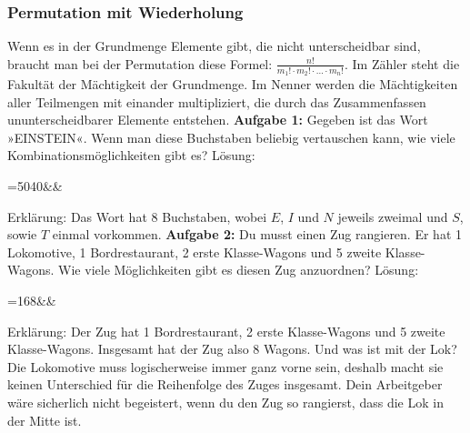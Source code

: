 \documentclass[12pt]{article}
\begin{document}
			\subsubsection{Permutation mit Wiederholung}
				Wenn es in der Grundmenge Elemente gibt, die nicht unterscheidbar sind, braucht man bei der Permutation diese Formel: $\frac{n!}{m_1!\cdot m_2!\cdot ...\cdot m_n!}$. Im Zähler steht die Fakultät der Mächtigkeit der Grundmenge. Im Nenner werden die Mächtigkeiten aller Teilmengen mit einander multipliziert, die durch das Zusammenfassen ununterscheidbarer Elemente entstehen.\newline\newline
				\textbf{Aufgabe 1:} Gegeben ist das Wort »EINSTEIN«. Wenn man diese Buchstaben beliebig vertauschen kann, wie viele Kombinationsmöglichkeiten gibt es?\newline\newline
				Lösung:
				\begin{flalign*}
					=5040&&
				\end{flalign*}
				Erklärung: Das Wort hat $8$ Buchstaben, wobei $E$, $I$ und $N$ jeweils zweimal und $S$, sowie $T$ einmal vorkommen.\newline\newline
				\textbf{Aufgabe 2:} Du musst einen Zug rangieren. Er hat 1 Lokomotive, 1 Bordrestaurant, 2 erste Klasse-Wagons und 5 zweite Klasse-Wagons. Wie viele Möglichkeiten gibt es diesen Zug anzuordnen?\newline\newline
				Lösung:
				\begin{flalign*}
				\frac{8!}{1!\cdot 2!\cdot 5!}=168&&
				\end{flalign*}
				Erklärung: Der Zug hat 1 Bordrestaurant, 2 erste Klasse-Wagons und 5 zweite Klasse-Wagons. Insgesamt hat der Zug also 8 Wagons. Und was ist mit der Lok? Die Lokomotive muss logischerweise immer ganz vorne sein, deshalb macht sie keinen Unterschied für die Reihenfolge des Zuges insgesamt. Dein Arbeitgeber wäre sicherlich nicht begeistert, wenn du den Zug so rangierst, dass die Lok in der Mitte ist.
\end{document}
